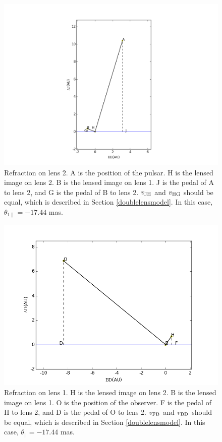 \documentclass[useAMS,usenatbib]{mn2e}
\begin{document}
\begin{figure}
\centering
\includegraphics[width=1.0\linewidth,scale=1.0]{First_reflection.png}
\caption{Refraction on lens 2. 
A is the position of the pulsar. H is the lensed image on lens 2. B is the lensed image on lens 1. J is the pedal of A to lens 2, and G is the pedal of B to lens 2. $v_{\rm JH}$ and $v_{\rm HG}$ should be equal, which is described in Section \ref{doublelensmodel}. In this case, $\theta_{1\parallel} =-17.44$ mas.}
\label{first_reflect}
\end{figure}

\begin{figure}
\centering
\includegraphics[width=1.0\linewidth]{Second_reflection.png}
\caption{Refraction on lens 1. 
H is the lensed image on lens 2. B is the lensed image on lens 1. O is the position of the observer. F is the pedal of H to lens 2, and D is the pedal of O to lens 2. $v_{\rm FB}$ and $v_{\rm BD}$ should be equal, which is described in Section \ref{doublelensmodel}. In this case, $\theta_{\parallel} = -17.44$ mas. }
\label{second_reflect}
\end{figure}
\end{document}

